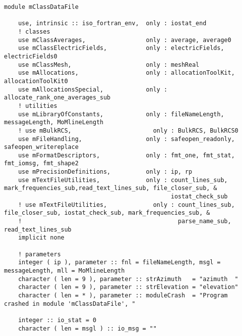 % 

{\tiny{
\begin{lstlisting}
module mClassDataFile

    use, intrinsic :: iso_fortran_env,  only : iostat_end
    ! classes
    use mClassAverages,                 only : average, average0
    use mClassElectricFields,           only : electricFields, electricFields0
    use mClassMesh,                     only : meshReal
    use mAllocations,                   only : allocationToolKit, allocationToolKit0
    use mAllocationsSpecial,            only : allocate_rank_one_averages_sub
    ! utilities
    use mLibraryOfConstants,            only : fileNameLength, messageLength, MoMlineLength
    ! use mBulkRCS,                       only : BulkRCS, BulkRCS0
    use mFileHandling,                  only : safeopen_readonly, safeopen_writereplace
    use mFormatDescriptors,             only : fmt_one, fmt_stat, fmt_iomsg, fmt_shape2
    use mPrecisionDefinitions,          only : ip, rp
    use mTextFileUtilities,             only : count_lines_sub, mark_frequencies_sub,read_text_lines_sub, file_closer_sub, &
                                               iostat_check_sub
    ! use mTextFileUtilities,             only : count_lines_sub, file_closer_sub, iostat_check_sub, mark_frequencies_sub, &
    !                                            parse_name_sub, read_text_lines_sub
    implicit none

    ! parameters
    integer ( ip ), parameter :: fnl = fileNameLength, msgl = messageLength, mll = MoMlineLength
    character ( len = 9 ), parameter :: strAzimuth   = "azimuth  "
    character ( len = 9 ), parameter :: strElevation = "elevation"
    character ( len = * ), parameter :: moduleCrash  = "Program crashed in module 'mClassDataFile', "

    integer :: io_stat = 0
    character ( len = msgl ) :: io_msg = ""


\end{lstlisting}}}
